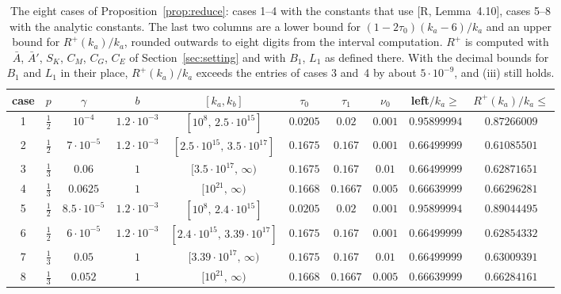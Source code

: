 \documentclass[11pt]{amsart}
\newcommand{\Abar}{\bar A}
\theoremstyle{definition}
\theoremstyle{remark}
\numberwithin{equation}{section}
\begin{document}
\begin{table}[ht]
\centering\footnotesize
\setlength{\tabcolsep}{3.5pt}
\begin{tabular}{@{}cccccccccc@{}}
\toprule
case & $p$ & $\gamma$ & $b$ & $[k_a,k_b]$ & $\tau_0$ & $\tau_1$ & $\nu_0$ & left$/k_a\ge$ & $R^+(k_a)/k_a\le$\\
\midrule
1 & $\frac12$ & $10^{-4}$ & $1.2\cdot10^{-3}$ & $[10^8,\,2.5\cdot10^{15}]$ & $0.0205$ & $0.02$ & $0.001$ & $0.95899994$ & $0.87266009$\\
2 & $\frac12$ & $7\cdot10^{-5}$ & $1.2\cdot10^{-3}$ & $[2.5\cdot10^{15},\,3.5\cdot10^{17}]$ & $0.1675$ & $0.167$ & $0.001$ & $0.66499999$ & $0.61085501$\\
3 & $\frac13$ & $0.06$ & $1$ & $[3.5\cdot10^{17},\,\infty)$ & $0.1675$ & $0.167$ & $0.01$ & $0.66499999$ & $0.62871651$\\
4 & $\frac13$ & $0.0625$ & $1$ & $[10^{21},\,\infty)$ & $0.1668$ & $0.1667$ & $0.005$ & $0.66639999$ & $0.66296281$\\
\midrule
5 & $\frac12$ & $8.5\cdot10^{-5}$ & $1.2\cdot10^{-3}$ & $[10^8,\,2.4\cdot10^{15}]$ & $0.0205$ & $0.02$ & $0.001$ & $0.95899994$ & $0.89044495$\\
6 & $\frac12$ & $6\cdot10^{-5}$ & $1.2\cdot10^{-3}$ & $[2.4\cdot10^{15},\,3.39\cdot10^{17}]$ & $0.1675$ & $0.167$ & $0.001$ & $0.66499999$ & $0.62854332$\\
7 & $\frac13$ & $0.05$ & $1$ & $[3.39\cdot10^{17},\,\infty)$ & $0.1675$ & $0.167$ & $0.01$ & $0.66499999$ & $0.63009391$\\
8 & $\frac13$ & $0.052$ & $1$ & $[10^{21},\,\infty)$ & $0.1668$ & $0.1667$ & $0.005$ & $0.66639999$ & $0.66284161$\\
\bottomrule
\end{tabular}
\caption{The eight cases of Proposition~\ref{prop:reduce}: cases 1--4 with the constants that use [R, Lemma~4.10],
cases 5--8 with the analytic constants. The last two columns are a lower bound for $(1-2\tau_0)(k_a-6)/k_a$ and an upper
bound for $R^+(k_a)/k_a$, rounded outwards to eight digits from the interval computation. $R^+$ is computed with $\Abar$,
$\bar A'$, $S_K$, $C_M$, $C_G$, $C_E$ of Section~\ref{sec:setting} and with $B_1$, $L_1$ as defined there. With the
decimal bounds for $B_1$ and $L_1$ in their place, $R^+(k_a)/k_a$ exceeds the entries of cases 3 and~4 by about
$5\cdot10^{-9}$, and (iii) still holds.}
\label{tab:cases}
\end{table}
\end{document}
